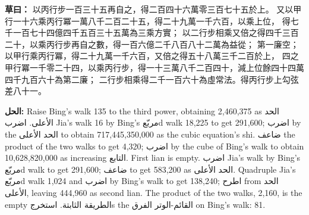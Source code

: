 \documentclass[11pt,a4paper]{article}
\newcommand{\working}[2]{\par\noindent%
  \begin{minipage}[t]{0.48\textwidth}\textbf{草曰：}#1\end{minipage}%
  \hfill%
  \begin{minipage}[t]{0.48\textwidth}\arabicfont\beginR\textbf{الحل:} #2\endR\end{minipage}\par\vspace{0.2cm}}
\begin{document}
\working{%
以丙行步一百三十五再自之，得二百四十六萬零三百七十五於上。
又以甲行一十六乘丙行冪一萬八千二百二十五，得二十九萬一千六百，以乘上位，
得七千一百七十四億四千五百三十五萬為三乘方實；
以二行步相乘又倍之得四千三百二十，以乘丙行步再自之數，得一百六億二千八百八十二萬為益從；
第一廉空；以甲行乘丙行冪，得二十九萬一千六百，又倍之得五十八萬三千二百於上，
四之甲行冪一千零二十四，以乘丙行步，得一十三萬八千二百四十，減上位餘四十四萬四千九百六十為第二廉；
二行步相乘得二千一百六十為虛常法。得丙行步上勾弦差八十一。}{%
Raise Bing's walk 135 to the third power, obtaining 2,460,375 as الحد الأعلى. اضرب Jia's walk 16 by Bing's مربّعd walk 18,225 to get 291,600; اضرب by the الحد الأعلى to obtain 717,445,350,000 as the cubic equation's shi. ضاعف the product of the two walks to get 4,320; اضرب by the cube of Bing's walk to obtain 10,628,820,000 as increasing التابع. First lian is empty. اضرب Jia's walk by Bing's مربّعd walk to get 291,600; ضاعف to get 583,200 as الحد الأعلى. Quadruple Jia's مربّعd walk 1,024 and اضرب by Bing's walk to get 138,240; اطرح from الحد الأعلى, leaving 444,960 as second lian. The product of the two walks, 2,160, is the empty الطريقة الثابتة. استخرجs the القائم-الوتر الفرق on Bing's walk: 81.}
\end{document}
